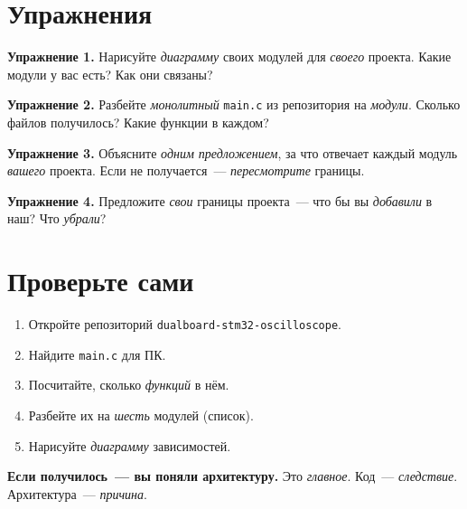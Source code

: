 \section{Упражнения}
\label{sec:arch-exercises}

\begin{exercisebox}
\textbf{Упражнение 1.} Нарисуйте \emph{диаграмму} своих
модулей для \emph{своего} проекта. Какие модули у вас есть?
Как они связаны?
\end{exercisebox}

\begin{exercisebox}
\textbf{Упражнение 2.} Разбейте \emph{монолитный}
\texttt{main.c} из репозитория на \emph{модули}.
Сколько файлов получилось? Какие функции в каждом?
\end{exercisebox}

\begin{exercisebox}
\textbf{Упражнение 3.} Объясните \emph{одним предложением},
за что отвечает каждый модуль \emph{вашего} проекта.
Если не получается~--- \emph{пересмотрите} границы.
\end{exercisebox}

\begin{exercisebox}
\textbf{Упражнение 4.} Предложите \emph{свои} границы проекта~---
что бы вы \emph{добавили} в наш? Что \emph{убрали}?
\end{exercisebox}

\section{Проверьте сами}
\label{sec:arch-check}

\begin{enumerate}
    \item Откройте репозиторий \texttt{dualboard-stm32-oscilloscope}.
    \item Найдите \texttt{main.c} для ПК.
    \item Посчитайте, сколько \emph{функций} в нём.
    \item Разбейте их на \emph{шесть} модулей (список).
    \item Нарисуйте \emph{диаграмму} зависимостей.
\end{enumerate}

\begin{ideabox}
\textbf{Если получилось~--- вы поняли архитектуру.} Это
\emph{главное}. Код~--- \emph{следствие}. Архитектура~---
\emph{причина}.
\end{ideabox}




